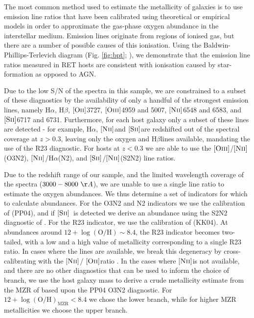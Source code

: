 \documentclass[fleqn,usenatbib,]{mnras}
\newcommand{\halpha}[0]{H$\alpha$}
\newcommand{\hbeta}[0]{H$\beta$}
\newcommand{\OII}[0]{$[\textnormal{\textsc{Oii}}]$}
\newcommand{\OIII}[0]{$[\textnormal{\textsc{Oiii}}]$}
\newcommand{\SII}[0]{$[\textnormal{\textsc{Sii}}]$}
\newcommand{\NII}[0]{$[\textnormal{\textsc{Nii}}]$}
\begin{document}
The most common method used to estimate the metallicity of galaxies is to use emission line ratios that have been calibrated using theoretical or empirical models in order to approximate the gas-phase oxygen abundance in the interstellar medium. Emission lines originate from regions of ionised gas, but there are a number of possible causes of this ionisation. Using the Baldwin-Phillips-Terlevich diagram (Fig. \ref{fig:bpt}; \citealt{Baldwin1981}), we demonstrate that the emission line ratios measured in RET hosts are consistent with ionisation caused by star-formation as opposed to AGN. 

Due to the low S/N of the spectra in this sample, we are constrained to a subset of these diagnostics by the availability of only a handful of the strongest emission lines, namely \halpha, \hbeta, \OII 3727, \OIII 4959 and 5007, \NII 6548 and 6583, and \SII 6717 and 6731. Furthermore, for each host galaxy only a subset of these lines are detected - for example, \halpha, \NII and \SII are redshifted out of the spectral coverage at $z>0.3$, leaving only the oxygen and \hbeta lines available, mandating the use of the R23 diagnostic. For hosts at $z<0.3$ we are able to use the \OIII /\NII (O3N2), \NII /\halpha (N2), and \SII /\NII (S2N2) line ratios. 

Due to the redshift range of our sample, and the limited wavelength coverage of the spectra ($3000-8000~\AA$), we are unable to use a single line ratio to estimate the oxygen abundances. We thus determine a set of indicators for which to calculate abundances. For the O3N2 and N2 indicators we use the calibration of \citet{Pettini2004} (PP04), and if \SII~is detected we derive an abundance using the S2N2 diagnostic of \citet{Dopita2016}. For the R23 indicator, we use the calibration of \citet{Kobulnicky2004} (KK04). At abundances around $12 + \log \mathrm{(O/H)} \sim 8.4$, the R23 indicator becomes two-tailed, with a low and a high value of metallicity corresponding to a single R23 ratio. In cases where the lines are available, we break this degeneracy by cross-calibrating with the \NII / \OII ratio \citep{Kewley2008}. In the cases where \NII is not available, and there are no other diagnostics that can be used to inform the choice of branch, we use the host galaxy mass to derive a crude metallicity estimate from the MZR of \citet{Kewley2008} based upon the PP04 O3N2 diagnostic. For $12 + \log \mathrm{(O/H)}_{\mathrm{MZR}} < 8.4$ we chose the lower branch, while for higher MZR metallicities we choose the upper branch.
\end{document}
